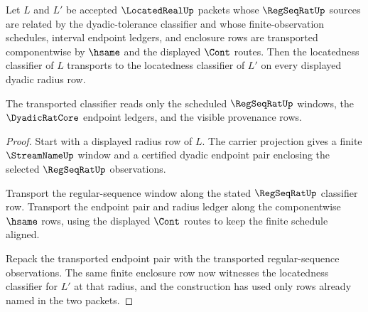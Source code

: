 \begin{theorem}
\label{thm:locatedreal-regseqrat-classifier-stability}
Let $L$ and $L'$ be accepted $\LocatedRealUp$ packets whose $\RegSeqRatUp$ sources are related by the dyadic-tolerance classifier and whose finite-observation schedules, interval endpoint ledgers, and enclosure rows are transported componentwise by $\hsame$ and the displayed $\Cont$ routes. Then the locatedness classifier of $L$ transports to the locatedness classifier of $L'$ on every displayed dyadic radius row.

The transported classifier reads only the scheduled $\RegSeqRatUp$ windows, the $\DyadicRatCore$ endpoint ledgers, and the visible provenance rows.
\end{theorem}
\begin{proof}
Start with a displayed radius row of $L$. The carrier projection gives a finite $\StreamNameUp$ window and a certified dyadic endpoint pair enclosing the selected $\RegSeqRatUp$ observations.

Transport the regular-sequence window along the stated $\RegSeqRatUp$ classifier row. Transport the endpoint pair and radius ledger along the componentwise $\hsame$ rows, using the displayed $\Cont$ routes to keep the finite schedule aligned.

Repack the transported endpoint pair with the transported regular-sequence observations. The same finite enclosure row now witnesses the locatedness classifier for $L'$ at that radius, and the construction has used only rows already named in the two packets.
\end{proof}

